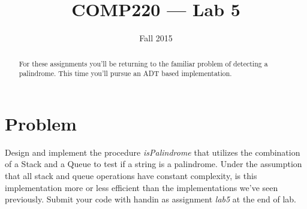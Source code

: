 \documentclass[10pt]{article}
\title{COMP220 --- Lab 5}
\author{ }
\date{Fall 2015}
\begin{document}
\maketitle

\begin{abstract}
For these assignments you'll be returning to the familiar problem of detecting a palindrome. This time you'll pursue an ADT based implementation.
\end{abstract}

\section{Problem}

Design and implement the procedure \textit{isPalindrome} that utilizes the combination of a Stack and a Queue to test if a string is a palindrome.  Under the assumption that all stack and queue operations have constant complexity, is this implementation more or less efficient than the implementations we've seen previously. Submit your code with handin as assignment \textit{lab5} at the end of lab.
\end{document}
